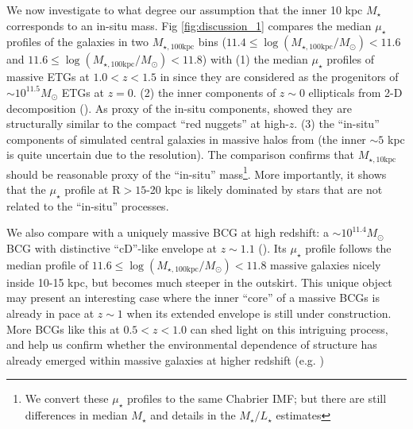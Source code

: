 \documentclass[a4paper,fleqn,usenatbib]{mnras}
\def\mstar{{$M_{\star}$}}
\def\minn{{$M_{\star,10\mathrm{kpc}}$}}
\def\mtot{{$M_{\star,100\mathrm{kpc}}$}}
\def\logmtot{{$\log (M_{\star,100\mathrm{kpc}}/M_{\odot})$}}
\def\m2l{{$M_{\star}/L_{\star}$}}
\def\mden{{$\mu_{\star}$}}
\begin{document}
    We now investigate to what degree our assumption that the inner 10 kpc \mstar{}
    corresponds to an in-situ mass.    
    Fig \ref{fig:discussion_1} compares the median \mden{} profiles of the 
    galaxies in two \mtot{} bins 
    ($11.4\leq$\logmtot{}$<11.6$ and $11.6\leq$\logmtot{}$<11.8$) with 
    (1) the median \mden{} profiles of massive ETGs at $1.0 < z < 1.5$ in
    \citealt{Patel2013} since they are considered as the progenitors of 
    ${\sim} 10^{11.5} M_{\odot}$ ETGs at $z=0$.    
    (2) the inner components of $z{\sim} 0$ ellipticals from 2-D decomposition 
    (\citealt{Huang2013a}).
    As proxy of the in-situ components, \citet{Huang2013b} showed they are 
    structurally similar to the compact ``red nuggets'' at high-$z$. 
    (3) the ``in-situ'' components of simulated central galaxies in massive halos 
    from \citet{Cooper2013} (the inner ${\sim} 5$ kpc is quite uncertain due to the 
    resolution).  
    The comparison confirms that \minn{} should be reasonable proxy of the 
    ``in-situ'' mass\footnote{We convert these \mden{} profiles to the same 
    Chabrier IMF; but there are still differences in median \mstar{} and 
    details in the \m2l{} estimates}.  
    More importantly, it shows that the \mden{} profile at 
    $\mathrm{R} > 15$-20 kpc is likely dominated by stars that are not related 
    to the ``in-situ'' processes.  
    
    We also compare with a uniquely massive BCG at high redshift: 
    a ${\sim} 10^{11.4} M_{\odot}$ BCG with distinctive ``cD''-like envelope at 
    $z{\sim} 1.1$ (\citealt{Liu2013}).  
    Its \mden{} profile follows the median profile of $11.6\leq$\logmtot{}$<11.8$ 
    massive galaxies nicely inside 10-15 kpc, but becomes much steeper in the outskirt.  
    This unique object may present an interesting case where the inner ``core'' of a 
    massive BCGs is already in pace at $z{\sim} 1$ when its extended envelope is still
    under construction.
    More BCGs like this at $0.5 < z < 1.0$ can shed light on this intriguing 
    process, and help us confirm whether the environmental dependence of structure 
    has already emerged within massive galaxies at higher redshift 
    (e.g. \citealt{Papovich2012})



\end{document}
